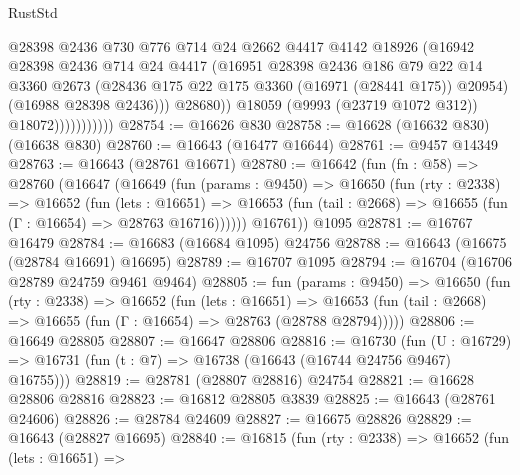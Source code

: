 \begin{lexlean}{RustStd}
\begin{coremodule}
                              @28398
                              @2436
                              @730
                              @776
                              @714
                              @24
                              @2662
                              @4417
                              @4142
                              @18926
                              (@16942
                                @28398
                                @2436
                                @714
                                @24
                                @4417
                                (@16951
                                  @28398
                                  @2436
                                  @186
                                  @79
                                  @22
                                  @14
                                  @3360
                                  @2673
                                  (@28436 @175 @22 @175 @3360 (@16971 (@28441 @175)) @20954)
                                  (@16988 @28398 @2436)))
                              @28680))
                          @18059
                          (@9993 (@23719 @1072 @312))
                          @18072)))))))))))
@28754 := @16626 @830
@28758 := @16628 (@16632 @830) (@16638 @830)
@28760 := @16643 (@16477 @16644)
@28761 := @9457 @14349
@28763 := @16643 (@28761 @16671)
@28780 := @16642
    (fun (fn : @58) =>
    @28760
      (@16647
        (@16649
          (fun (params : @9450) =>
          @16650
            (fun (rty : @2338) =>
            @16652
              (fun (lets : @16651) =>
              @16653 (fun (tail : @2668) => @16655 (fun (Γ : @16654) => @28763 @16716))))))
        @16761))
    @1095
@28781 := @16767 @16479
@28784 := @16683 (@16684 @1095) @24756
@28788 := @16643 (@16675 (@28784 @16691) @16695)
@28789 := @16707 @1095
@28794 := @16704 (@16706 @28789 @24759 @9461 @9464)
@28805 := fun (params : @9450) =>
  @16650
    (fun (rty : @2338) =>
    @16652
      (fun (lets : @16651) =>
      @16653 (fun (tail : @2668) => @16655 (fun (Γ : @16654) => @28763 (@28788 @28794)))))
@28806 := @16649 @28805
@28807 := @16647 @28806
@28816 := @16730
    (fun (U : @16729) => @16731 (fun (t : @7) => @16738 (@16643 (@16744 @24756 @9467) @16755)))
@28819 := @28781 (@28807 @28816) @24754
@28821 := @16628 @28806 @28816
@28823 := @16812 @28805 @3839
@28825 := @16643 (@28761 @24606)
@28826 := @28784 @24609
@28827 := @16675 @28826
@28829 := @16643 (@28827 @16695)
@28840 := @16815
    (fun (rty : @2338) =>
    @16652
      (fun (lets : @16651) =>

\end{coremodule}
\end{lexlean}
